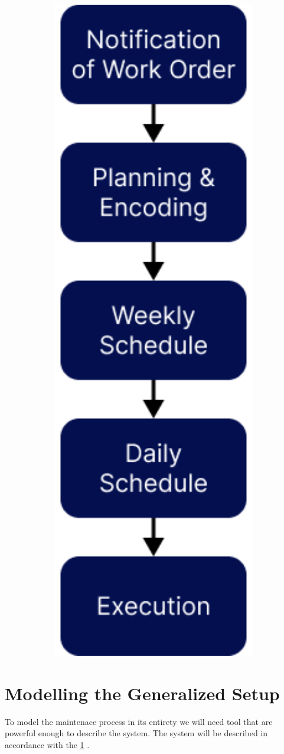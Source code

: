 \begin{figure}[H]
\includegraphics[width=1.0\textwidth]{figures/top-level-schedule-overview.png}
\label{top-level-schedule-overview.png}
\end{figure}





\chapter{Modelling the Generalized Setup}
To model the maintenace process in its entirety we will need tool that are powerful enough to describe the system. The system will be described in accordance 
with the \ref{top-level-schedule-overview.png} \cite{palmer_maintenance_2019}.
